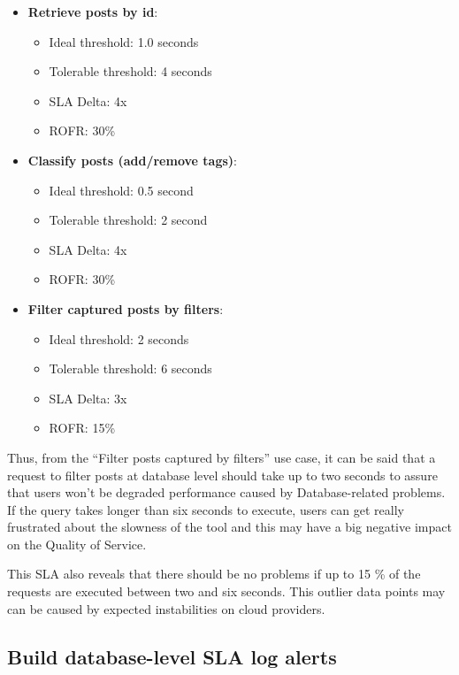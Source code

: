 \begin{itemize}
\item{
\textbf{Retrieve posts by id}:
	\begin{itemize}
		\item{Ideal threshold: 1.0 seconds}
		\item{Tolerable threshold: 4 seconds}
		\item{SLA Delta: 4x}
		\item{ROFR: 30\%}
	\end{itemize}
}
\item{

\textbf{Classify posts (add/remove tags)}:
	\begin{itemize}
		\item{Ideal threshold: 0.5 second}
		\item{Tolerable threshold: 2 second}
		\item{SLA Delta: 4x}
		\item{ROFR: 30\%}
	\end{itemize}
}

\item{
	\textbf{Filter captured posts by filters}:
	\begin{itemize}
		\item{Ideal threshold: 2 seconds}
		\item{Tolerable threshold: 6 seconds}
		\item{SLA Delta: 3x}
		\item{ROFR: 15\%}
	\end{itemize}
}
\end{itemize}

Thus, from the ``Filter posts captured by filters'' use case, it can be said that a request to filter posts at database level should take up to two seconds to assure that users won't be degraded performance caused by Database-related problems. If the query takes longer than six seconds to execute, users can get really frustrated about the slowness of the tool and this may have a big negative impact on the Quality of Service. 

This SLA also reveals that there should be no problems if up to 15 \% of the requests are executed between two and six seconds. This outlier data points may can be caused by expected instabilities on cloud providers. 

\clearpage
\subsection{Build database-level SLA log alerts}

